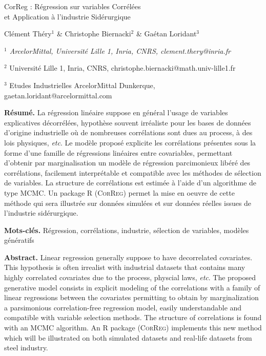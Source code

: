 \documentclass[12pt]{article}
\begin{document}
     \def\Var{{\rm Var}\,}


\begin{center}
{\Large
	{\sc  CorReg : Régression sur variables Corrélées\\ et Application à l'industrie Sidérurgique}
}
\bigskip

  Clément Théry$^{1}$ \& Christophe Biernacki$^{2}$ \& Gaétan Loridant$^{3}$
\bigskip

{\it
$^{1}$ ArcelorMittal, Université Lille 1, Inria, CNRS, clement.thery@inria.fr
 
$^{2}$ Université Lille 1, Inria, CNRS, christophe.biernacki@math.univ-lille1.fr

$^{3}$ Etudes Industrielles ArcelorMittal Dunkerque, gaetan.loridant@arcelormittal.com\textbf{}
}
\end{center}
\bigskip


{\bf Résumé.} La régression linéaire suppose en général l'usage de variables explicatives décorrélées, hypothèse souvent irréaliste pour les bases de données d'origine industrielle où de nombreuses corrélations sont dues au process, à des lois physiques, {\it etc}. Le modèle  proposé explicite les corrélations présentes sous la forme d'une famille de régressions linéaires entre covariables, permettant d'obtenir par marginalisation un modèle de régression parcimonieux libéré des corrélations, facilement interprétable et compatible avec les méthodes de sélection de variables. La structure de corrélations est estimée à l'aide d'un algorithme de type MCMC. Un package R (\textsc{CorReg}) permet la mise en oeuvre de cette méthode qui sera illustrée sur données simulées et sur données réelles issues de l'industrie sidérurgique.
\smallskip

{\bf Mots-clés.} Régression, corrélations, industrie, sélection de variables, modèles génératifs
\bigskip\bigskip

{\bf Abstract.} Linear regression generally suppose to have decorrelated covariates. This hypothesis is often irrealist with industrial datasets that contains many highly correlated covariates due to the process, physcial laws,  {\it etc}. The proposed generative model consists in explicit modeling of the correlations with a family of linear regressions between the covariates permitting to obtain by marginalization a parsimonious correlation-free regression model, easily understandable and compatible with variable selection methods. The structure of correlations is found with an MCMC algorithm. An R package (\textsc{CorReg}) implements this new method which will be illustrated on both simulated datasets and real-life datasets from steel industry.
\smallskip
\end{document}
